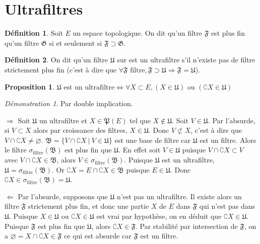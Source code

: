 \documentclass[a4paper, 11pt, french]{book}
\newenvironment{itemise}{\itemize}{\enditemize}
\theoremstyle{plain} %
\newtheorem{proposition}{Proposition}
\theoremstyle{definition} %
\newtheorem{definition}{Définition}
\theoremstyle{remark} %
\newtheorem*{demonstration}{Démonstration}
\newcommand{\1}{\mathds{1}}
\newcommand\vide{\varnothing}
\newcommand\ou{\text{ ou }}
\renewcommand{\frak}[1]{\mathfrak{#1}}
\newcommand\ens[2]{\{#1 \ |\ #2\}}
\newcommand\equivalence[3]{
	\begin{demonstration}
		#1
		\begin{itemise}
			\item[$\Longrightarrow$] #2
			\item[$\Longleftarrow$] #3
		\end{itemise}
	\end{demonstration}
}
\begin{document}
\section{Ultrafiltres}

\begin{definition}
	Soit $E$ un espace topologique.
	On dit qu'un filtre $\frak{F}$ est plus fin qu'un filtre $\frak{G}$ si et seulement si $\frak{F}\supset\frak{G}$.
\end{definition}

\begin{definition}
	On dit qu'un filtre $\frak{U}$ sur est un ultrafiltre s'il n'existe pas de filtre strictement plus fin (c'est à dire que $\forall\frak{F}\text{ filtre}, \frak{F}\supset\frak{U}\Rightarrow\frak{F}=\frak{U}$).
\end{definition}

\begin{proposition}
	$\frak{U}\text{ est un ultrafiltre}\iff\forall X\subset E, (X\in\frak{U})\ou(\complement X\in\frak{U})$
\end{proposition}

\equivalence{Par double implication.}{
	Soit $\frak{U}$ un ultrafiltre et $X\in\frak{P}(E)$ tel que $X\notin\frak{U}$.
		Soit $V\in\frak{U}$.
		Par l'absurde, si $V\subset X$ alors par croissance des filtres, $X\in\frak{U}$.
		Donc $V\not\subset X$, c'est à dire que $V\cap\complement X\neq\vide$.
		$\frak{B}=\ens{V\cap\complement X}{V\in\frak{U}}$ est une base de filtre car $\frak{U}$ est un filtre.
		Alors le filtre $\sigma_\text{filtre}(\frak{B})$ est plus fin que $\frak{U}$.
		En effet soit $V\in\frak{U}$ puisque $V\cap\complement X\subset V$ avec $V\cap\complement X\in\frak{B}$, alors $V\in\sigma_\text{filtre}(\frak{B})$.
		Puisque $\frak{U}$ est un ultrafiltre, $\frak{U}=\sigma_\text{filtre}(\frak{B})$.
		Or $\complement X=E\cap\complement X\in\frak{B}$ puisque $E\in\frak{U}$.
		Donc $\complement X\in\sigma_\text{filtre}(\frak{B})=\frak{U}$.
}{
	Par l'absurde, supposons que $\frak{U}$ n'est pas un ultrafiltre.
		Il existe alors un filtre $\frak{F}$ strictement plus fin, et donc une partie $X$ de $E$ dans $\frak{F}$ qui n'est pas dans $\frak{U}$.
		Puisque $X\in\frak{U}\ou\complement X\in\frak{U}$ est vrai par hypothèse, on en déduit que $\complement X\in\frak{U}$.
		Puisque $\frak{F}$ est plus fin que $\frak{U}$, alors $\complement X\in\frak{F}$.
		Par stabilité par intersection de $\frak{F}$, on a $\vide=X\cap\complement X\in\frak{F}$ ce qui est absurde car $\frak{F}$ est un filtre.
}
\end{document}

